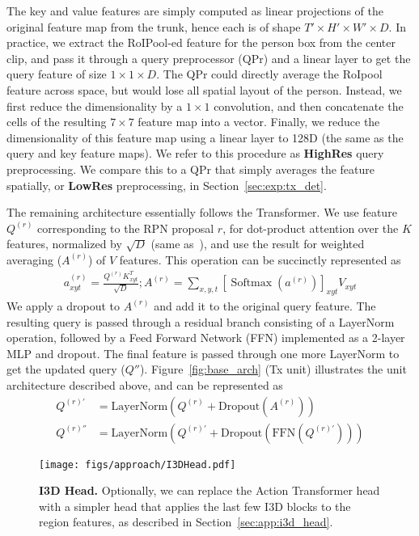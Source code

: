 \documentclass[10pt,twocolumn,letterpaper]{article}
\newcommand{\Tx}[0]{Action Transformer}
\newcommand{\QPr}[0]{QPr}
\newcommand{\qprconcat}[0]{HighRes}
\newcommand{\qpravg}[0]{LowRes}
\DeclareMathOperator*{\Softmax}{Softmax}
\begin{document}
The key
and value features are simply computed as linear projections  of the
original feature map from the trunk, hence each is of shape $T'\times
H'\times W' \times D$.
In practice, we extract
the RoIPool-ed feature for the person box from the center clip, 
and
pass it through a query preprocessor (\QPr{}) 
and a linear layer 
to get
the query feature of size $1\times 1\times D$.  The \QPr{} could directly
average the RoIpool feature across space,
but would lose all spatial layout of the person.  Instead,
we first reduce the
dimensionality by a $1\times 1$ convolution, and then concatenate the cells of the resulting
$7\times 7$ feature map into a vector.  Finally, we reduce the
dimensionality of this feature map using a linear layer to 128D 
(the same as the query and key feature maps).
We refer to this procedure as {\bf
\qprconcat{}} query preprocessing.  We compare this to a \QPr{} that simply averages the
feature spatially, or {\bf \qpravg{}} preprocessing, in Section~\ref{sec:exp:tx_det}.



The remaining architecture essentially follows the Transformer. We use feature $Q^{(r)}$ corresponding to the RPN proposal $r$, for dot-product attention over the $K$ features, normalized by $\sqrt{D}$ (same as~\cite{vaswani2017attention}), and use the result for weighted averaging ($A^{(r)}$) of $V$ features. This operation can be succinctly represented as
\begin{align*}
a_{xyt}^{(r)} = \frac{Q^{(r)}K_{xyt}^T}{\sqrt{D}};
A^{(r)} = \sum_{x,y,t} \left[ \Softmax \left( a^{(r)} \right) \right]_{xyt} V_{xyt}
\end{align*}
We apply a dropout to $A^{(r)}$ and add it to the original query feature. The resulting query is 
passed through a residual branch consisting of a LayerNorm~\cite{ba2016layer} operation, followed by a Feed Forward Network (FFN) implemented as a 2-layer MLP and dropout.
The final feature is passed through one more LayerNorm to get the updated query ($Q''$).
Figure~\ref{fig:base_arch} (Tx unit) illustrates the unit architecture described above, and can be represented as
\begin{align*}
Q^{(r)'} &= \mathrm{LayerNorm} \left( Q^{(r)} + \mathrm{Dropout}\left( A^{(r)} \right) \right) \\
Q^{(r)''} &= \mathrm{LayerNorm} \left( Q^{(r)'} + \mathrm{Dropout} \left( \mathrm{FFN} \left( Q^{(r)'}\right) \right) \right)
\end{align*}

\begin{figure}[t]
\centering
\texttt{[image: figs/approach/I3DHead.pdf]}
\caption{
{\bf I3D Head.}
Optionally, we can replace the \Tx{} head with a simpler head that applies the last few I3D blocks to the region features,
as described in Section~\ref{sec:app:i3d_head}.
}\label{fig:i3d_head_arch}
\end{figure}
\end{document}
